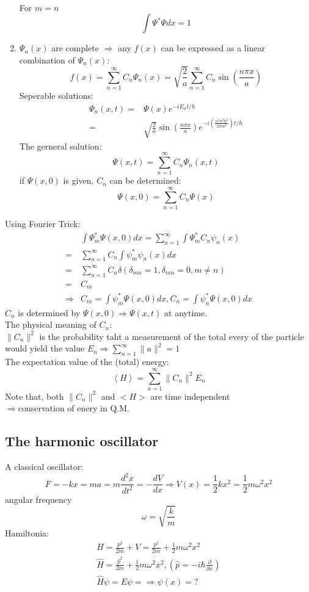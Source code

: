 \documentclass[12pt, a4paper]{article}
\begin{document}
\begin{enumerate}
\begin{align*}
\end{align*}
For $m=n$ $$\int\Psi^*\Psi dx=1$$
\item $\Psi_n(x)$ are complete $\Rightarrow$ any $f(x)$ can be expressed as a linear combination of $\Psi_n(x)$:
$$f(x)=\sum_{n=1}^{\infty}C_n\Psi_n(x)=\sqrt{\frac{2}{a}}\sum_{n=1}^{\infty}C_n\sin(\frac{n\pi x}{a})$$
Seperable solutions:
\begin{align*}
\Psi_n(x,t)=&\Psi(x)e^{-iE_nt/\hbar}\\
=&\sqrt{\frac{2}{a}}\sin(\frac{n\pi x}{a})e^{-i(\frac{n^2\pi^2\hbar^2}{2ma^2})t/\hbar}
\end{align*}
The gerneral solution:
$$\Psi(x,t)=\sum_{n=1}^{\infty}C_n\Psi_n(x,t)$$
if $\Psi(x,0)$ is given, $C_n$ can be determined:
$$\Psi(x,0)=\sum_{n=1}^{\infty}C_n\Psi(x)$$
\end{enumerate}

Using Fourier Trick:
\begin{align*}
&\int\Psi_m^*\Psi(x,0)dx=\sum_{n=1}^{\infty}\int\Psi_m^*C_n\psi_n(x)\\
=&\sum_{n=1}^{\infty}C_n\int\psi_m^*\psi_n(x)dx\\
=&\sum_{n=1}^{\infty}C_n\delta (\delta_{mn}=1,\delta_{mn}=0, m\not =n)\\
=&C_m\\
\Rightarrow &C_m=\int\psi_m^*\Psi(x,0)dx, C_n=\int	\psi_n^*\Psi(x,0)dx
\end{align*}
$C_n$ is determined by $\Psi(x,0)\Rightarrow\Psi(x,t)$ at anytime.\\
The physical meaning of $C_n$:\\
$\|C_n\|^2$ is the probability taht a measurement of the total every of the particle would yield the value $E_n\Rightarrow \sum_{n=1}^{\infty}\|a\|^2=1$\\
The expectation value of the (total) energy:
$$\left< H\right>=\sum_{n=1}^{\infty}\|C_n\|^2E_n$$
Note that, both $\|C_n\|^2$ and $<H>$ are time independent\\
$\Rightarrow$conservation of enery in Q.M.

\subsection{The harmonic oscillator}
A classical oscillator: $$F=-kx=ma=m\frac{d^2x}{dt^2}=-\frac{dV}{dx}\Rightarrow V(x)=\frac{1}{2}kx^2=\frac{1}{2}m\omega^2x^2$$
angular frequency
$$\omega=\sqrt{\frac{k}{m}}$$
Hamiltonia:
\begin{align*}
H=\frac{p^2}{2m}+V=\frac{p^2}{2m}+\frac{1}{2}m\omega^2x^2\\
\hat{H}=\frac{\hat{p}^2}{2m}+\frac{1}{2}m\omega^2x^2,(\hat{p}=-i\hbar\frac{\partial}{\partial x})\\
\hat{H}\psi=E\psi=\Rightarrow \psi(x)=?
\end{align*}
\end{document}
